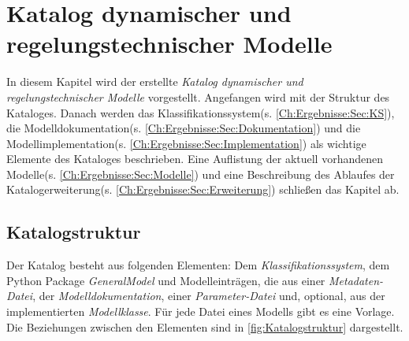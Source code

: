 \chapter{Katalog dynamischer und regelungstechnischer Modelle}
\label{Ch:Ergebnisse}
In diesem Kapitel wird der erstellte \textit{Katalog dynamischer und regelungstechnischer Modelle} vorgestellt. Angefangen wird mit der Struktur des Kataloges. Danach werden das Klassifikationssystem(s. \ref{Ch:Ergebnisse:Sec:KS}), die Modelldokumentation(s. \ref{Ch:Ergebnisse:Sec:Dokumentation}) und die Modellimplementation(s. \ref{Ch:Ergebnisse:Sec:Implementation}) als wichtige Elemente des Kataloges beschrieben. Eine Auflistung der aktuell vorhandenen Modelle(s. \ref{Ch:Ergebnisse:Sec:Modelle}) und eine Beschreibung des Ablaufes der Katalogerweiterung(s. \ref{Ch:Ergebnisse:Sec:Erweiterung}) schließen das Kapitel ab.
\section{Katalogstruktur}
\label{Ch:Ergebnisse:Sec:Struktur}
Der Katalog besteht aus folgenden Elementen: Dem \textit{Klassifikationssystem}, dem Python Package \textit{GeneralModel} und Modelleinträgen, die aus einer \textit{Metadaten-Datei}, der \textit{Modelldokumentation}, einer \textit{Parameter-Datei} und, optional, aus der implementierten \textit{Modellklasse}. Für jede Datei eines Modells gibt es eine Vorlage. Die Beziehungen zwischen den Elementen sind in \autoref{fig:Katalogstruktur} dargestellt.

